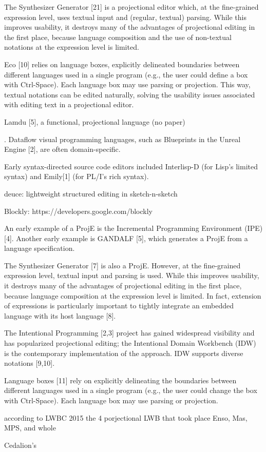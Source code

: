 The Synthesizer Generator [21] is a projectional editor which, at the fine-grained expression level, uses textual input and (regular, textual) parsing.
While this improves usability, it destroys many of the advantages of projectional editing in the first place, because language composition and the use of non-textual notations at the expression level is limited.

Eco [10] relies on language boxes, explicitly delineated boundaries between different languages used in a single program (e.g., the user could define a box with Ctrl-Space).
Each language box may use parsing or projection.
This way, textual notations can be edited naturally, solving the usability issues associated with editing text in a projectional editor.

Lamdu [5], a functional, projectional language (no paper)

. Dataflow visual programming languages, such as Blueprints in the Unreal Engine [2], are often domain-specific.


Early syntax-directed source code editors included Interlisp-D (for Lisp’s limited syntax) and Emily[1] (for PL/I’s rich syntax).

deuce: lightweight structured editing in sketch-n-sketch

Blockly: https://developers.google.com/blockly



An early example of a ProjE is the Incremental Programming Environment (IPE) [4].
Another early example is GANDALF [5], which generates a ProjE from a language specification.

The Synthesizer Generator [7] is also a ProjE.
However, at the fine-grained expression level, textual input and parsing is used.
While this improves usability, it destroys many of the advantages of projectional editing in the first place, because language composition at the expression level is limited.
In fact, extension of expressions is particularly important to tightly integrate an embedded language with its host language [8].

The Intentional Programming [2,3] project has gained widespread visibility and has popularized projectional editing; the Intentional Domain Workbench (IDW) is the contemporary implementation of the approach.
IDW supports diverse notations [9,10].


Language boxes [11] rely on explicitly delineating the boundaries between different languages used in a single program (e.g., the user could change the box with Ctrl-Space).
Each language box may use parsing or projection.


according to LWBC 2015 the 4 porjectional LWB that took place Enso, Mas, MPS, and whole


Cedalion's 







